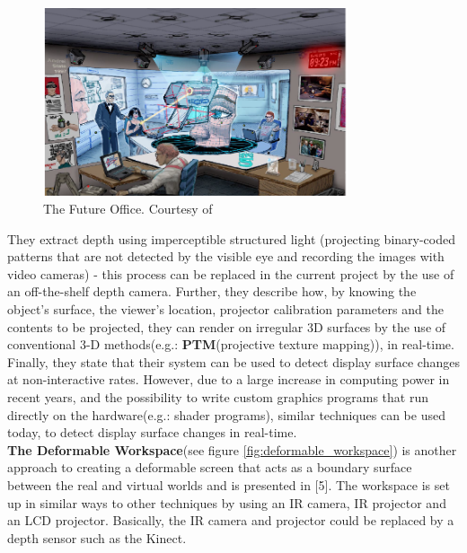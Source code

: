 \documentclass[]{article}
\begin{document}
\begin{figure}[hbtp]
    \centering
    \includegraphics[width=0.8\textwidth]{figures/FutureOffice.PNG}
    \caption{The Future Office. Courtesy of \cite{raskar98}}
    \label{fig:future_office}
\end{figure}

They extract depth using imperceptible structured light (projecting binary-coded patterns that are not detected by the visible eye and recording the images with video cameras) - this process can be replaced in the current project by the use of an off-the-shelf depth camera. Further, they describe how, by knowing the object's surface, the viewer's location, projector calibration parameters and the contents to be projected, they can render on irregular 3D surfaces by the use of conventional 3-D methods(e.g.: \textbf{PTM}(projective texture mapping)), in real-time. Finally, they state that their system can be used to detect display surface changes at non-interactive rates. However, due to a large increase in computing power in recent years, and the possibility to write custom graphics programs that run directly on the hardware(e.g.: shader programs), similar techniques can be used today, to detect display surface changes in real-time.\\

\textbf{The Deformable Workspace}(see figure \ref{fig:deformable_workspace}) is another approach to creating a deformable screen that acts as a boundary surface between the real and virtual worlds and is presented in [5]. The workspace is set up in similar ways to other techniques by using an IR camera, IR projector and an LCD projector. Basically, the IR camera and projector could be replaced by a depth sensor such as the Kinect. 
\end{document}
